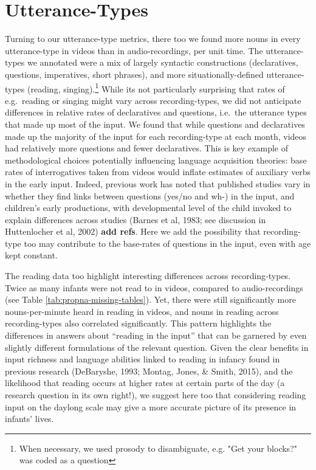 \documentclass[floatsintext,man]{apa6}
\theoremstyle{definition}
\theoremstyle{definition}
\theoremstyle{definition}
\theoremstyle{remark}
\begin{document}
\section{Utterance-Types}\label{utterance-types}

Turning to our utterance-type metrics, there too we found more nouns in
every utterance-type in videos than in audio-recordings, per unit time.
The utterance-types we annotated were a mix of largely syntactic
constructions (declaratives, questions, imperatives, short phrases), and
more situationally-defined utterance-types (reading,
singing).\footnote{When necessary, we used prosody to disambiguate, e.g. "Get your blocks?" was coded as a question}
While its not particularly surprising that rates of e.g.~reading or
singing might vary across recording-types, we did not anticipate
differences in relative rates of declaratives and questions, i.e.~the
utterance types that made up most of the input. We found that while
questions and declaratives made up the majority of the input for each
recording-type at each month, videos had relatively more questions and
fewer declaratives. This is key example of methodological choices
potentially influencing language acquisition theories: base rates of
interrogatives taken from videos would inflate estimates of auxiliary
verbs in the early input. Indeed, previous work has noted that published
studies vary in whether they find links between questions (yes/no and
wh-) in the input, and children's early productions, with developmental
level of the child invoked to explain differences across studies (Barnes
et al, 1983; see discussion in Huttenlocher et al, 2002) \textbf{add
refs}. Here we add the possibility that recording-type too may
contribute to the base-rates of questions in the input, even with age
kept constant.

The reading data too highlight interesting differences across
recording-types. Twice as many infants were not read to in videos,
compared to audio-recordings (see Table
\ref{tab:propna-missing-tables}). Yet, there were still significantly
more nouns-per-minute heard in reading in videos, and nouns in reading
across recording-types also correlated significantly. This pattern
highlights the differences in answers about \enquote{reading in the
input} that can be garnered by even slightly different formulations of
the relevant question. Given the clear benefits in input richness and
language abilities linked to reading in infancy found in previous
research (DeBaryshe, 1993; Montag, Jones, \& Smith, 2015), and the
likelihood that reading occurs at higher rates at certain parts of the
day (a research question in its own right!), we suggest here too that
considering reading input on the daylong scale may give a more accurate
picture of its presence in infants' lives.
\end{document}
